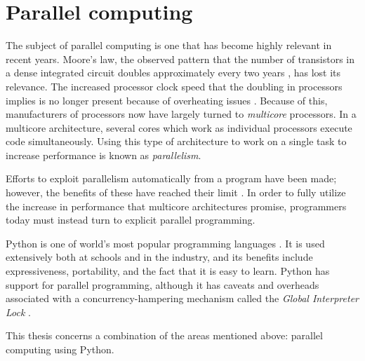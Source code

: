 \section{Parallel computing}
The subject of parallel computing is one that has become highly relevant in recent years.
Moore's law, the observed pattern that the number of transistors in a dense integrated circuit doubles approximately every two
years \cite{moore_1998_cramming_cmcoic},
has lost its relevance. The increased processor clock speed that the doubling in processors implies is no longer present because of
overheating issues \cite[p. 1]{herlihy_2012_art_taomprr}. Because of this, manufacturers of processors now have
largely turned to \emph{multicore} processors. In a multicore architecture, several cores which work as individual processors execute
code simultaneously. Using this type of architecture to work on a single task to increase performance is known as \emph{parallelism}.

Efforts to exploit parallelism automatically from a program have been made; however, the benefits of these have reached their
limit \cite[p. 7-12]{mccool_2012_structured_spppfec}. In order to fully utilize the increase in performance that multicore
architectures promise, programmers today must instead turn to explicit parallel programming.

Python is one of world's most popular programming languages \cite{krill_2015_python_psnhilp}. It is used extensively both at schools and
in the industry, and its benefits include expressiveness, portability, and the fact that it is easy to learn. Python has support for
parallel programming, although it has caveats and overheads associated with a concurrency-hampering mechanism called the
\emph{Global Interpreter Lock} \cite{beazley_150745UTC_introduction_aitpc}.

This thesis concerns a combination of the areas mentioned above: parallel computing using Python.



